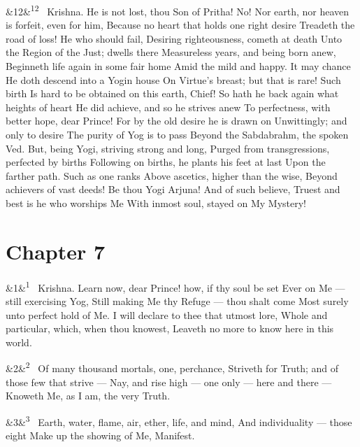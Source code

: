 \documentclass[12pt]{article}
\newcommand{\para}[1][]{\par\noindent\ifx&#1&\else\textsuperscript{\footnotesize #1}~\fi}
\begin{document}
\para[12] Krishna. He is not lost, thou Son of Pritha! No! Nor earth, nor heaven is forfeit, even for him, Because no heart that holds one right desire Treadeth the road of loss! He who should fail, Desiring righteousness, cometh at death Unto the Region of the Just; dwells there Measureless years, and being born anew, Beginneth life again in some fair home Amid the mild and happy. It may chance He doth descend into a Yogin house On Virtue's breast; but that is rare! Such birth Is hard to be obtained on this earth, Chief! So hath he back again what heights of heart He did achieve, and so he strives anew To perfectness, with better hope, dear Prince! For by the old desire he is drawn on Unwittingly; and only to desire The purity of Yog is to pass Beyond the Sabdabrahm, the spoken Ved. But, being Yogi, striving strong and long, Purged from transgressions, perfected by births Following on births, he plants his feet at last Upon the farther path. Such as one ranks Above ascetics, higher than the wise, Beyond achievers of vast deeds! Be thou Yogi Arjuna! And of such believe, Truest and best is he who worships Me With inmost soul, stayed on My Mystery!

\section*{Chapter 7}

\para[1] Krishna. Learn now, dear Prince! how, if thy soul be set Ever on Me --- still exercising Yog, Still making Me thy Refuge --- thou shalt come Most surely unto perfect hold of Me. I will declare to thee that utmost lore, Whole and particular, which, when thou knowest, Leaveth no more to know here in this world.

\para[2] Of many thousand mortals, one, perchance, Striveth for Truth; and of those few that strive --- Nay, and rise high --- one only --- here and there --- Knoweth Me, as I am, the very Truth.

\para[3] Earth, water, flame, air, ether, life, and mind, And individuality --- those eight Make up the showing of Me, Manifest.
\end{document}
